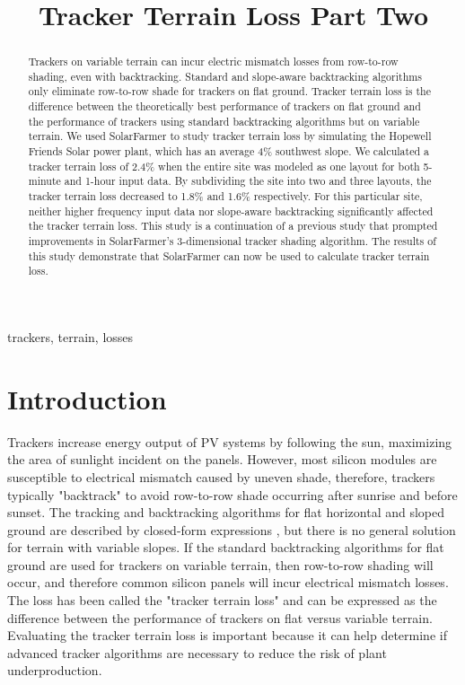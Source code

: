 \documentclass[conference]{IEEEtran}
\begin{document}
\title{Tracker Terrain Loss Part Two}

\author{
	}

\maketitle

\begin{abstract}
Trackers on variable terrain can incur electric mismatch losses from row-to-row shading, even with backtracking. Standard and slope-aware backtracking algorithms only eliminate row-to-row shade for trackers on flat ground. Tracker terrain loss is the difference between the theoretically best performance of trackers on flat ground and the performance of trackers using standard backtracking algorithms but on variable terrain. We used SolarFarmer to study tracker terrain loss by simulating the Hopewell Friends Solar power plant, which has an average 4\% southwest slope. We calculated a tracker terrain loss of 2.4\% when the entire site was modeled as one layout for both 5-minute and 1-hour input data. By subdividing the site into two and three layouts, the tracker terrain loss decreased to 1.8\% and 1.6\% respectively. For this particular site, neither higher frequency input data nor slope-aware backtracking significantly affected the tracker terrain loss. This study is a continuation of a previous study that prompted improvements in SolarFarmer's 3-dimensional tracker shading algorithm. The results of this study demonstrate that SolarFarmer can now be used to calculate tracker terrain loss.
\end{abstract}

\begin{IEEEkeywords}
trackers, terrain, losses
\end{IEEEkeywords}

\section{Introduction}
Trackers increase energy output of PV systems by following the sun, maximizing the area of sunlight incident on the panels. However, most silicon modules are susceptible to electrical mismatch caused by uneven shade, therefore, trackers typically "backtrack" to avoid  row-to-row shade occurring after sunrise and before sunset. The tracking and backtracking algorithms for flat horizontal and sloped ground are described by closed-form expressions \cite{Marion2013,Anderson2020}, but there is no general solution for terrain with variable slopes. If the standard backtracking algorithms for flat ground are used for trackers on variable terrain, then row-to-row shading will occur, and therefore common silicon panels will incur electrical mismatch losses. The loss has been called the "tracker terrain loss" and can be expressed as the difference between the performance of trackers on flat versus variable terrain. Evaluating the tracker terrain loss is important because it can help determine if advanced tracker algorithms are necessary to reduce the risk of plant underproduction.
\end{document}
